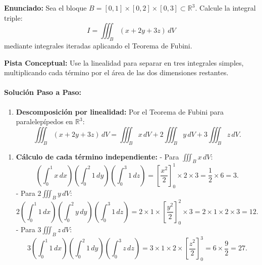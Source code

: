 \documentclass[11pt,a4paper]{article}
\begin{document}
\begin{tcolorbox}[colback=white,colframe=gray!40,arc=1mm,boxrule=0.5pt,left=3mm,right=3mm,top=2mm,bottom=2mm]
\textbf{Enunciado:} Sea el bloque $B = [0, 1] \times [0, 2] \times [0, 3] \subset \mathbb{R}^3$. Calcule la integral triple:
\begin{equation*}
I = \iiint_B (x + 2y + 3z) \, dV
\end{equation*}
mediante integrales iteradas aplicando el Teorema de Fubini.
\end{tcolorbox}

\begin{tcolorbox}[colback=yellow!4,colframe=accentamber!70,arc=1mm,boxrule=0.5pt,left=3mm,right=3mm,top=1.5mm,bottom=1.5mm]
\textbf{Pista Conceptual:} Use la linealidad para separar en tres integrales simples, multiplicando cada término por el área de las dos dimensiones restantes.
\end{tcolorbox}

\paragraph{Solución Paso a Paso:}\par
\begin{enumerate}[label=\textbf{\arabic*.}]
\item \textbf{Descomposición por linealidad:}
Por el Teorema de Fubini para paralelepípedos en $\mathbb{R}^3$:
\begin{equation*}
\iiint_B (x + 2y + 3z) \, dV = \iiint_B x \, dV + 2 \iiint_B y \, dV + 3 \iiint_B z \, dV.
\end{equation*}
\end{enumerate}

\begin{enumerate}[label=\textbf{\arabic*.}]
\item \textbf{Cálculo de cada término independiente:}
- Para $\iiint_B x \, dV$:
\begin{equation*}
\left(\int_0^1 x \, dx\right) \left(\int_0^2 1 \, dy\right) \left(\int_0^3 1 \, dz\right) = \left[\frac{x^2}{2}\right]_0^1 \times 2 \times 3 = \frac{1}{2} \times 6 = 3.
\end{equation*}
- Para $2 \iiint_B y \, dV$:
\begin{equation*}
2 \left(\int_0^1 1 \, dx\right) \left(\int_0^2 y \, dy\right) \left(\int_0^3 1 \, dz\right) = 2 \times 1 \times \left[\frac{y^2}{2}\right]_0^2 \times 3 = 2 \times 1 \times 2 \times 3 = 12.
\end{equation*}
- Para $3 \iiint_B z \, dV$:
\begin{equation*}
3 \left(\int_0^1 1 \, dx\right) \left(\int_0^2 1 \, dy\right) \left(\int_0^3 z \, dz\right) = 3 \times 1 \times 2 \times \left[\frac{z^2}{2}\right]_0^3 = 6 \times \frac{9}{2} = 27.
\end{equation*}
\end{enumerate}
\end{document}
